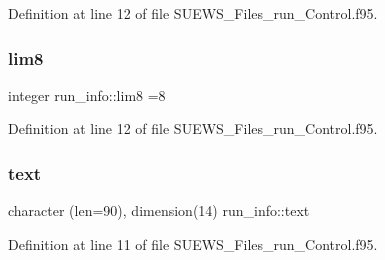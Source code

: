 Definition at line 12 of file S\+U\+E\+W\+S\+\_\+\+Files\+\_\+run\+\_\+\+Control.\+f95.

\mbox{\label{namespacerun__info_a541da993ba7c0323fde4a512605bbe8f}} 
\subsubsection{\texorpdfstring{lim8}{lim8}}
{\footnotesize\ttfamily integer run\+\_\+info\+::lim8 =8}



Definition at line 12 of file S\+U\+E\+W\+S\+\_\+\+Files\+\_\+run\+\_\+\+Control.\+f95.

\mbox{\label{namespacerun__info_a7ebcc0191b287ed4b8f80e6080cc1dc8}} 
\subsubsection{\texorpdfstring{text}{text}}
{\footnotesize\ttfamily character (len=90), dimension(14) run\+\_\+info\+::text}



Definition at line 11 of file S\+U\+E\+W\+S\+\_\+\+Files\+\_\+run\+\_\+\+Control.\+f95.


